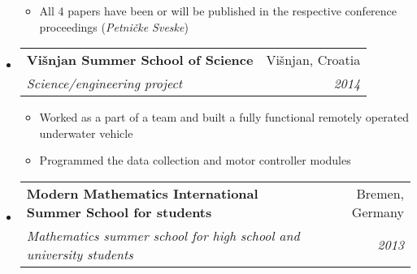 \documentclass[a4paper]{article}
\makeatletter
\newcommand{\ressubheading}[4]{
\begin{tabular*}{6.5in}{l@{\cftdotfill{\cftsecdotsep}\extracolsep{\fill}}r}
		\textbf{#1} & #2 \\
		\textit{#3} & \textit{#4} \\
\end{tabular*}\vspace{-2pt}}
\makeatother
\begin{document}
\begin{itemize}
\begin{itemize}
		\item All 4 papers have been or will be published in the respective conference proceedings (\emph{Petničke Sveske})
	\end{itemize}
	\item \ressubheading{Višnjan Summer School of Science}{Višnjan, Croatia}{Science/engineering project}{2014}
	\begin{itemize}
		\item Worked as a part of a team and built a fully functional remotely operated underwater vehicle
		\item Programmed the data collection and motor controller modules 
	\end{itemize}
	\item \ressubheading{Modern Mathematics International Summer School for students}{Bremen, Germany}{Mathematics summer school for high school and university students}{2013}
\end{itemize}
\end{document}

